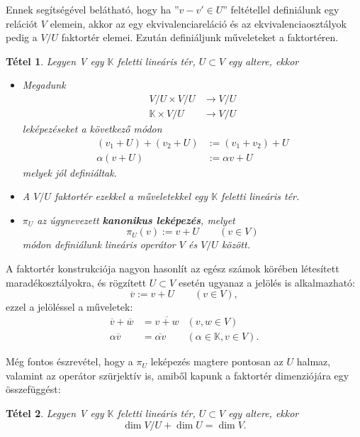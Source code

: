 \documentclass[oneside, titlepage, 12pt, a4paper]{report}
\newtheorem{theorem}{Tétel}[section]
\begin{document}
Ennek segítségével belátható, hogy ha  ''$v - v' \in U$'' feltétellel definiálunk egy relációt $V$ elemein, akkor az egy ekvivalenciareláció és az ekvivalenciaosztályok pedig a $V / U$ faktortér elemei. Ezután definiáljunk műveleteket a faktortéren.
\begin{theorem}
Legyen V egy $\mathbb{K}$ feletti lineáris tér, $U \subset V$ egy altere, ekkor
\begin{itemize}
\item
Megadunk
\begin{align*}
V / U \times V / U & \longrightarrow V / U \\
\mathbb{K} \times V / U & \longrightarrow V / U
\end{align*}
leképezéseket a következő módon
\begin{align}
(v_1 + U) + (v_2 + U) &:= (v_1 + v_2) + U \\
\alpha (v + U) &:= \alpha v + U
\end{align}
melyek jól definiáltak.
\item
A $V / U$ faktortér ezekkel a műveletekkel egy $\mathbb{K}$ feletti lineáris tér.
\item
$\pi_U$ az úgynevezett \textbf{kanonikus leképezés}, melyet
\begin{equation*}
\pi_U(v) := v + U \qquad (v \in V)
\end{equation*}
módon definiálunk lineáris operátor $V$ és $V / U$ között.
\end{itemize}
\end{theorem}

A faktortér konstrukciója nagyon hasonlít az egész számok körében létesített maradékosztályokra, és rögzített $U \subset V$ esetén ugyanaz a jelölés is alkalmazható:
\begin{equation*}
\overline{v} := v + U \qquad (v \in V),
\end{equation*}
ezzel a jelöléssel a műveletek:
\begin{align*}
\overline{v} + \overline{w} &= \overline{v + w} &(v, w \in V) \\
\alpha \overline{v} &= \overline{\alpha v} &(\alpha \in \mathbb{K}, v \in V).
\end{align*}

Még fontos észrevétel, hogy a $\pi_U$ leképezés magtere pontosan az $U$ halmaz, valamint az operátor szürjektív is, amiből kapunk a faktortér dimenziójára egy összefüggést:
\begin{theorem}
Legyen V egy $\mathbb{K}$ feletti lineáris tér, $U \subset V$ egy altere, ekkor
\begin{equation}
\dim V / U + \dim U = \dim V.
\end{equation}
\end{theorem}
\end{document}
